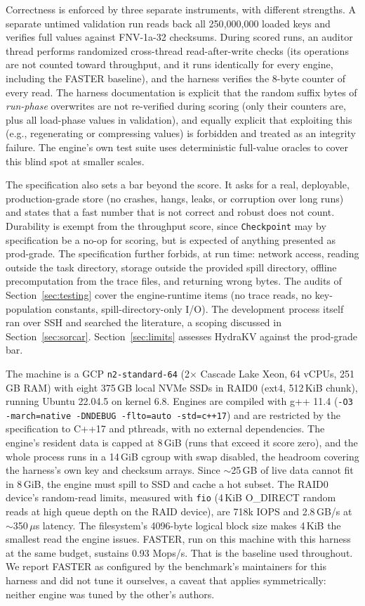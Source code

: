 \documentclass{article}
\newcommand{\FASTERBase}{0.93}          %
\newcommand{\NKeys}{250{,}000{,}000}
\newcommand{\MemBudget}{8\,GiB}
\newcommand{\DataSize}{$\sim$25\,GB}
\newcommand{\FioIops}{718k}
\newcommand{\FioBw}{2.8\,GB/s}
\newcommand{\FioLat}{$\sim$350\,$\mu$s}
\begin{document}
Correctness is enforced by three separate instruments, with different strengths. A separate untimed validation run reads back all \NKeys{} loaded keys and verifies full values against FNV-1a-32 checksums. During scored runs, an auditor thread performs randomized cross-thread read-after-write checks (its operations are not counted toward throughput, and it runs identically for every engine, including the FASTER baseline), and the harness verifies the 8-byte counter of every read. The harness documentation is explicit that the random suffix bytes of \emph{run-phase} overwrites are not re-verified during scoring (only their counters are, plus all load-phase values in validation), and equally explicit that exploiting this (e.g., regenerating or compressing values) is forbidden and treated as an integrity failure. The engine's own test suite uses deterministic full-value oracles to cover this blind spot at smaller scales.

The specification also sets a bar beyond the score. It asks for a real, deployable, production-grade store (no crashes, hangs, leaks, or corruption over long runs) and states that a fast number that is not correct and robust does not count. Durability is exempt from the throughput score, since \texttt{Checkpoint} may by specification be a no-op for scoring, but is expected of anything presented as prod-grade. The specification further forbids, at run time: network access, reading outside the task directory, storage outside the provided spill directory, offline precomputation from the trace files, and returning wrong bytes. The audits of Section~\ref{sec:testing} cover the engine-runtime items (no trace reads, no key-population constants, spill-directory-only I/O). The development process itself ran over SSH and searched the literature, a scoping discussed in Section~\ref{sec:sorcar}. Section~\ref{sec:limits} assesses HydraKV against the prod-grade bar.

The machine is a GCP \texttt{n2-standard-64} (2$\times$ Cascade Lake Xeon, 64 vCPUs, 251\,GB RAM) with eight 375\,GB local NVMe SSDs in RAID0 (ext4, 512\,KiB chunk), running Ubuntu 22.04.5 on kernel 6.8. Engines are compiled with g++ 11.4 (\texttt{-O3 -march=native -DNDEBUG -flto=auto -std=c++17}) and are restricted by the specification to C++17 and pthreads, with no external dependencies. The engine's resident data is capped at \MemBudget{} (runs that exceed it score zero), and the whole process runs in a 14\,GiB cgroup with swap disabled, the headroom covering the harness's own key and checksum arrays. Since \DataSize{} of live data cannot fit in \MemBudget, the engine must spill to SSD and cache a hot subset. The RAID0 device's random-read limits, measured with \texttt{fio} (4\,KiB O\_DIRECT random reads at high queue depth on the RAID device), are \FioIops{} IOPS and \FioBw{} at \FioLat{} latency. The filesystem's 4096-byte logical block size makes 4\,KiB the smallest read the engine issues. FASTER, run on this machine with this harness at the same budget, sustains \FASTERBase{} Mops/s. That is the baseline used throughout. We report FASTER as configured by the benchmark's maintainers for this harness and did not tune it ourselves, a caveat that applies symmetrically: neither engine was tuned by the other's authors.
\end{document}
